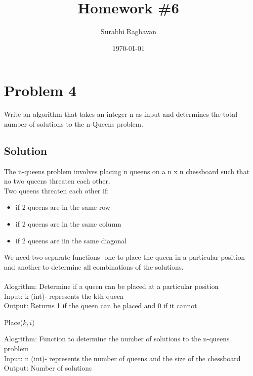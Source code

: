 \documentclass[12pt]{article}
\newcommand{\yourname}{Surabhi Raghavan}  %
\begin{document}
\title{Homework \#6}
\author{\yourname}
\date{\today}

\maketitle

\section*{Problem 4}
Write an algorithm that takes an integer n as input and determines the total
number of solutions to the n-Queens problem.
\subsection*{Solution}
The n-queens problem  involves placing n queens on a n x n chessboard such that no two queens threaten each other.
\\
Two queens threaten each other if:
\begin{itemize}
\item if 2 queens are in the same row
\item if 2 queens are in the same column 
\item if 2 queens are iin the same diagonal 
\end{itemize}
We need two separate functions- one to place the queen in a particular position and another to determine all combinations of the solutions.\\
\\
Alogrithm: Determine if a queen can  be placed at a particular position \\
Input: k (int)- represents the kth queen \\
Output: Returns 1 if the queen can be placed and 0 if it cannot\\

\begin{algorithm}
    \caption{Place($k, i$)}
    \begin{algorithmic}[1]
                \State {}
            \EndIf
        \EndFor
        \State {}
    \end{algorithmic}
    \end{algorithm}
    

Alogrithm: Function to determine the number of solutions to the n-queens problem\\
Input: n (int)- represents the number of queens and the size of the chessboard \\
Output: Number of solutions\\
\end{document}
